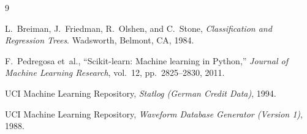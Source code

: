\documentclass[12pt,a4paper]{article}
\begin{document}
\begin{thebibliography}{9}

  L.~Breiman, J.~Friedman, R.~Olshen, and C.~Stone,
  \textit{Classification and Regression Trees}.
  Wadsworth, Belmont, CA, 1984.

  F.~Pedregosa et~al.,
  ``Scikit-learn: Machine learning in Python,''
  \textit{Journal of Machine Learning Research}, vol.~12, pp.~2825--2830,
  2011.

  UCI Machine Learning Repository,
  \textit{Statlog (German Credit Data)}, 1994.

  UCI Machine Learning Repository,
  \textit{Waveform Database Generator (Version 1)}, 1988.

\end{thebibliography}
\end{document}
